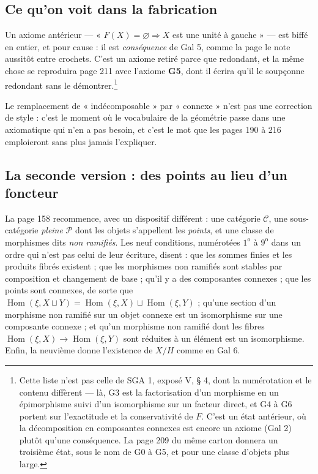 \documentclass[11pt,a4paper]{article}
\begin{document}
\subsection*{Ce qu'on voit dans la fabrication}

Un axiome antérieur --- « $F(X) = \varnothing \Rightarrow X$ est une unité à
gauche » --- est biffé en entier, et pour cause : il est \emph{conséquence} de
Gal 5, comme la page le note aussitôt entre crochets. C'est un axiome retiré
parce que redondant, et la même chose se reproduira page 211 avec l'axiome
\textbf{G5}, dont il écrira qu'il le soupçonne redondant sans le
démontrer.\footnote{Cette liste n'est pas celle de SGA 1, exposé V, § 4, dont
la numérotation et le contenu diffèrent --- là, G3 est la factorisation d'un
morphisme en un épimorphisme suivi d'un isomorphisme sur un facteur direct, et
G4 à G6 portent sur l'exactitude et la conservativité de $F$. C'est un état
antérieur, où la décomposition en composantes connexes est encore un axiome
(Gal 2) plutôt qu'une conséquence. La page 209 du même carton donnera un
troisième état, sous le nom de G0 à G5, et pour une classe d'objets plus large.}

Le remplacement de « indécomposable » par « connexe » n'est pas une correction
de style : c'est le moment où le vocabulaire de la géométrie passe dans une
axiomatique qui n'en a pas besoin, et c'est le mot que les pages 190 à 216
emploieront sans plus jamais l'expliquer.

\subsection*{La seconde version : des points au lieu d'un foncteur}

La page 158 recommence, avec un dispositif différent : une catégorie
$\mathcal{C}$, une sous-catégorie \emph{pleine} $\mathcal{P}$ dont les objets
s'appellent les \emph{points}, et une classe de morphismes dits \emph{non
ramifiés}. Les neuf conditions, numérotées $1^{\mathrm{o}}$ à
$9^{\mathrm{o}}$ dans un ordre qui n'est pas celui de leur écriture, disent :
que les sommes finies et les produits fibrés existent ; que les morphismes non
ramifiés sont stables par composition et changement de base ; qu'il y a des
composantes connexes ; que les points sont connexes, de sorte que
$\operatorname{Hom}(\xi, X \sqcup Y) = \operatorname{Hom}(\xi, X) \sqcup
\operatorname{Hom}(\xi, Y)$ ; qu'une section d'un morphisme non ramifié sur un
objet connexe est un isomorphisme sur une composante connexe ; et qu'un
morphisme non ramifié dont les fibres $\operatorname{Hom}(\xi, X) \to
\operatorname{Hom}(\xi, Y)$ sont réduites à un élément est un isomorphisme.
Enfin, la neuvième donne l'existence de $X/H$ comme en Gal 6.
\end{document}
